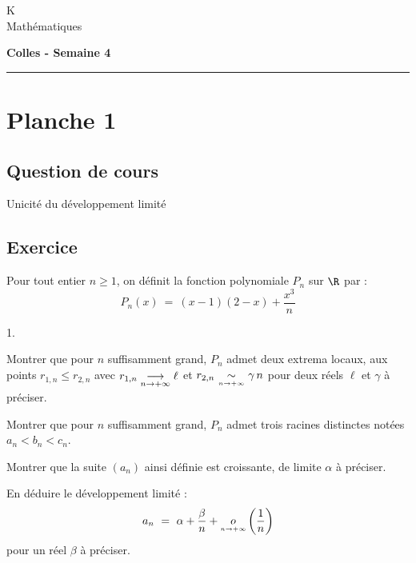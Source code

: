 \documentclass[11pt]{article}%
\begin{document}
\begin{flushleft}
K \\
Mathématiques
\end{flushleft}

\begin{center}
\textbf{\Large{Colles - Semaine 4}}
\end{center}

\hrule

\vspace*{0,2cm}

\section*{Planche 1}

\subsection*{Question de cours}

\noindent
Unicité du développement limité


\subsection*{Exercice} %

\noindent
Pour tout entier $n\geq 1$, on définit la fonction polynomiale $P_n$ 
sur $\R$ par :
\[
 P_n(x) \ = \ (x-1)(2-x) + \dfrac{x^3}{n}
\]
\begin{noliste}{1.}
 \item Montrer que pour $n$ suffisamment grand, $P_n$ admet deux 
 extrema locaux, aux points $r_{1,n} \leq r_{2,n}$ avec $r_{1,n} 
 \underset{n\to +\infty}{\longrightarrow} \ell$ et $r_{2,n} {\ \underset {{\overset {n \to +\infty}{}}}{\sim}\ } \gamma \, n$ pour deux réels $\ell$
 et $\gamma$ à préciser.
 
 \item Montrer que pour $n$ suffisamment grand, $P_n$ admet trois 
 racines distinctes notées $a_n < b_n < c_n$.
 
 \item Montrer que la suite $(a_n)$ ainsi définie est croissante, 
 de limite $\alpha$ à préciser.
 
 \item En déduire le développement limité :
 \[
  a_n \ = \ \alpha + \dfrac{\beta}{n} + {\underset {{\overset {n\rightarrow +\infty}{}}}{o}} \left(\dfrac{1}{n}
  \right)
 \]
 pour un réel $\beta$ à préciser.
\end{noliste}






\newpage
\end{document}

